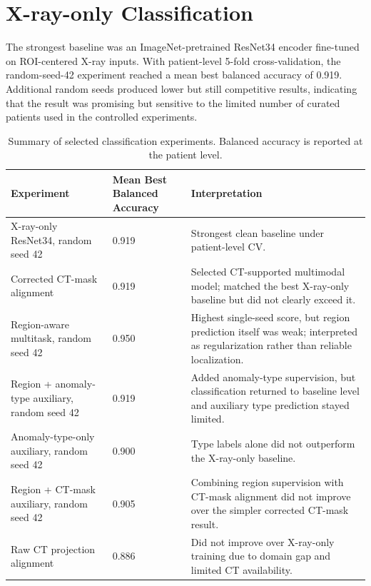 \section{X-ray-only Classification}
The strongest baseline was an ImageNet-pretrained ResNet34 encoder fine-tuned on ROI-centered X-ray inputs. With patient-level 5-fold cross-validation, the random-seed-42 experiment reached a mean best balanced accuracy of 0.919. Additional random seeds produced lower but still competitive results, indicating that the result was promising but sensitive to the limited number of curated patients used in the controlled experiments.

\begin{table}[H]
    \centering
    \caption{Summary of selected classification experiments. Balanced accuracy is reported at the patient level.}
    \label{tab:classification_summary}
    \scriptsize
    \begin{tabularx}{\textwidth}{p{}|p{}|X}
        \hline
        \textbf{Experiment} & \textbf{Mean Best Balanced Accuracy} & \textbf{Interpretation} \\
        \hline
        X-ray-only ResNet34, random seed 42 & 0.919 & Strongest clean baseline under patient-level CV. \\
        Corrected CT-mask alignment & 0.919 & Selected CT-supported multimodal model; matched the best X-ray-only baseline but did not clearly exceed it. \\
        Region-aware multitask, random seed 42 & 0.950 & Highest single-seed score, but region prediction itself was weak; interpreted as regularization rather than reliable localization. \\
        Region + anomaly-type auxiliary, random seed 42 & 0.919 & Added anomaly-type supervision, but classification returned to baseline level and auxiliary type prediction stayed limited. \\
        Anomaly-type-only auxiliary, random seed 42 & 0.900 & Type labels alone did not outperform the X-ray-only baseline. \\
        Region + CT-mask auxiliary, random seed 42 & 0.905 & Combining region supervision with CT-mask alignment did not improve over the simpler corrected CT-mask result. \\
        Raw CT projection alignment & 0.886 & Did not improve over X-ray-only training due to domain gap and limited CT availability. \\
        \hline
    \end{tabularx}
\end{table}

